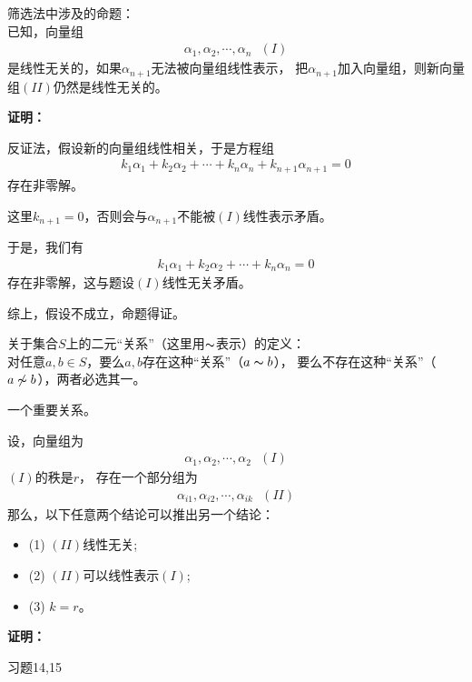 \documentclass{article}
\begin{document}
\begin{zremark}
  筛选法中涉及的命题：\\

  已知，向量组
  \begin{align*}
    \alpha_1, \alpha_2, \cdots, \alpha_n \ \ \ (I)
  \end{align*}
  是线性无关的，如果$\alpha_{n + 1}$无法被向量组线性表示，
  把$\alpha_{n + 1}$加入向量组，则新向量组$(II)$仍然是线性无关的。 
\end{zremark}

\textbf{证明：}

反证法，假设新的向量组线性相关，于是方程组
\begin{align*}
  k_1 \alpha_1 + k_2 \alpha_2 + \cdots + k_n \alpha_n + k_{n + 1} \alpha_{n + 1} = 0
\end{align*}
存在非零解。

这里$k_{n + 1} = 0$，否则会与$\alpha_{n + 1}$不能被$(I)$线性表示矛盾。

于是，我们有
\begin{align*}
  k_1 \alpha_1 + k_2 \alpha_2 + \cdots + k_n \alpha_n = 0
\end{align*}
存在非零解，这与题设$(I)$线性无关矛盾。

综上，假设不成立，命题得证。

\begin{zremark}
  关于集合$S$上的二元“关系”（这里用$\thicksim$表示）的定义：\\
  对任意$a, b \in S$，要么$a, b$存在这种“关系”（$a \thicksim b$），
  要么不存在这种“关系”（$a \not\thicksim b$），两者必选其一。
\end{zremark}

\begin{zremark}
  一个重要关系。

  设，向量组为
  \begin{align*}
    \alpha_1, \alpha_2, \cdots, \alpha_2 \ \ \ (I)
  \end{align*}
  $(I)$的秩是$r$，
  存在一个部分组为
  \begin{align*}
    \alpha_{i1}, \alpha_{i2}, \cdots, \alpha_{ik} \ \ \ (II)
  \end{align*}
  那么，以下任意两个结论可以推出另一个结论：
  \begin{itemize}
    \item (1) $(II)$线性无关;
    \item (2) $(II)$可以线性表示$(I)$;
    \item (3) $k = r$。
  \end{itemize}
\end{zremark}

\textbf{证明：}

习题14,15
\end{document}
